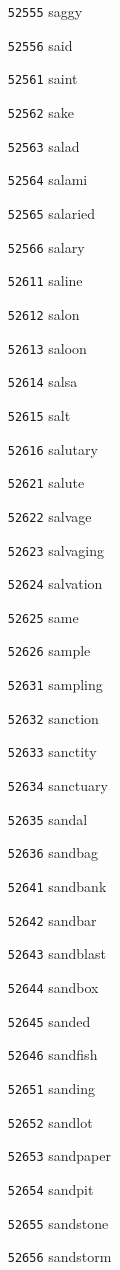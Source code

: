 \documentclass[twoside,11pt]{article}
\begin{document}
\begin{multicols}{5}
\begin{enumerate}
\item[\texttt{52555}] saggy
\item[\texttt{52556}] said
\item[\texttt{52561}] saint
\item[\texttt{52562}] sake
\item[\texttt{52563}] salad
\item[\texttt{52564}] salami
\item[\texttt{52565}] salaried
\item[\texttt{52566}] salary
\item[\texttt{52611}] saline
\item[\texttt{52612}] salon
\item[\texttt{52613}] saloon
\item[\texttt{52614}] salsa
\item[\texttt{52615}] salt
\item[\texttt{52616}] salutary
\item[\texttt{52621}] salute
\item[\texttt{52622}] salvage
\item[\texttt{52623}] salvaging
\item[\texttt{52624}] salvation
\item[\texttt{52625}] same
\item[\texttt{52626}] sample
\item[\texttt{52631}] sampling
\item[\texttt{52632}] sanction
\item[\texttt{52633}] sanctity
\item[\texttt{52634}] sanctuary
\item[\texttt{52635}] sandal
\item[\texttt{52636}] sandbag
\item[\texttt{52641}] sandbank
\item[\texttt{52642}] sandbar
\item[\texttt{52643}] sandblast
\item[\texttt{52644}] sandbox
\item[\texttt{52645}] sanded
\item[\texttt{52646}] sandfish
\item[\texttt{52651}] sanding
\item[\texttt{52652}] sandlot
\item[\texttt{52653}] sandpaper
\item[\texttt{52654}] sandpit
\item[\texttt{52655}] sandstone
\item[\texttt{52656}] sandstorm

\end{enumerate}
\end{multicols}
\end{document}

